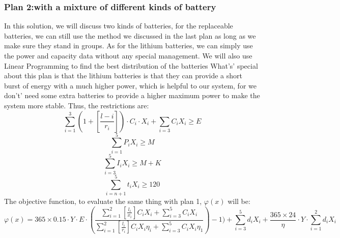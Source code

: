 \documentclass[UTF-8]{article}
\begin{document}
    \subsubsection{Plan 2:with a mixture of different kinds of battery}
    In this solution, we will discuss two kinds of batteries, for the replaceable batteries, we can still use the method we discussed in the last plan as long as we make sure they stand
    in groups. As for the lithium batteries, we can simply use the power and capacity data without any special management. We will also use Linear Programming to find the best distribution of 
    the batteries
    What's' special about this plan is that the lithium batteries is that they can provide a short burst of energy with a much higher power, which is helpful to our system, for we don't' need some extra batteries 
    to provide a higher maximum power to make the system more stable.
    Thus, the restrictions are:
    $$\sum_{i=1}^3(1+[\frac{l-i}{r_i}]) \cdot C_i \cdot X_i + \sum_{i=3}C_iX_i\geq E$$
    $$\sum_{i=1}^5P_iX_i\geq M$$
    $$\sum_{i=3}^5I_iX_i\geq M+K$$
    $$\sum_{i=n+1}^5 t_iX_i\geq 120$$
    The objective function, to evaluate the same thing with plan 1, $\varphi (x)$ will be:
    $$\varphi (x) = 365 \times 0.15 \cdot Y \cdot E \cdot (\frac{\sum^2_{i=1}[\frac{l_i}{x_i}]C_iX_i+\sum_{i=3}^5C_iX_i}{\sum^2_{i=1}[\frac{l_i}{r_i}]C_iX_i\eta _i+\sum_{i=3}^5C_iX_i\eta _1})-1)
    + \sum_{i=3} ^5d_iX_i+\frac{365 \times 24}{\eta } \cdot Y \cdot \sum_{i=1} ^2d_iX_i $$
\end{document}
